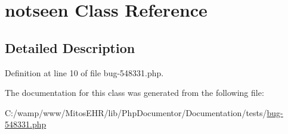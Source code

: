 \hypertarget{classnotseen}{\section{notseen \-Class \-Reference}
\label{classnotseen}
}


\subsection{\-Detailed \-Description}


\-Definition at line 10 of file bug-\/548331.\-php.



\-The documentation for this class was generated from the following file\-:\begin{DoxyCompactItemize}
\item 
\-C\-:/wamp/www/\-Mitos\-E\-H\-R/lib/\-Php\-Documentor/\-Documentation/tests/\hyperlink{bug-548331_8php}{bug-\/548331.\-php}\end{DoxyCompactItemize}
